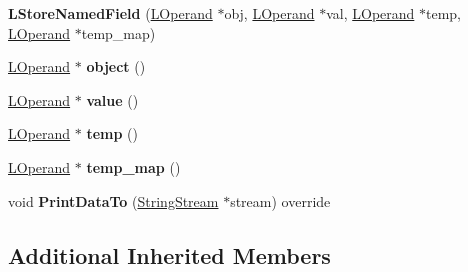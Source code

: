 \begin{DoxyCompactItemize}
\item 
{\bfseries L\+Store\+Named\+Field} (\hyperlink{classv8_1_1internal_1_1_l_operand}{L\+Operand} $\ast$obj, \hyperlink{classv8_1_1internal_1_1_l_operand}{L\+Operand} $\ast$val, \hyperlink{classv8_1_1internal_1_1_l_operand}{L\+Operand} $\ast$temp, \hyperlink{classv8_1_1internal_1_1_l_operand}{L\+Operand} $\ast$temp\+\_\+map)\hypertarget{classv8_1_1internal_1_1_l_store_named_field_a11463f51eadad871a2d243b6aff1733c}{}\label{classv8_1_1internal_1_1_l_store_named_field_a11463f51eadad871a2d243b6aff1733c}

\item 
\hyperlink{classv8_1_1internal_1_1_l_operand}{L\+Operand} $\ast$ {\bfseries object} ()\hypertarget{classv8_1_1internal_1_1_l_store_named_field_a322fe15f20a68dfd3429f31bb46ce109}{}\label{classv8_1_1internal_1_1_l_store_named_field_a322fe15f20a68dfd3429f31bb46ce109}

\item 
\hyperlink{classv8_1_1internal_1_1_l_operand}{L\+Operand} $\ast$ {\bfseries value} ()\hypertarget{classv8_1_1internal_1_1_l_store_named_field_a7c1b623b85070a53e7c8ca36113808c7}{}\label{classv8_1_1internal_1_1_l_store_named_field_a7c1b623b85070a53e7c8ca36113808c7}

\item 
\hyperlink{classv8_1_1internal_1_1_l_operand}{L\+Operand} $\ast$ {\bfseries temp} ()\hypertarget{classv8_1_1internal_1_1_l_store_named_field_ad77491ce510eaa0f150539ec8815c14f}{}\label{classv8_1_1internal_1_1_l_store_named_field_ad77491ce510eaa0f150539ec8815c14f}

\item 
\hyperlink{classv8_1_1internal_1_1_l_operand}{L\+Operand} $\ast$ {\bfseries temp\+\_\+map} ()\hypertarget{classv8_1_1internal_1_1_l_store_named_field_a69d1d376feceac483680f42a3a6989b9}{}\label{classv8_1_1internal_1_1_l_store_named_field_a69d1d376feceac483680f42a3a6989b9}

\item 
void {\bfseries Print\+Data\+To} (\hyperlink{classv8_1_1internal_1_1_string_stream}{String\+Stream} $\ast$stream) override\hypertarget{classv8_1_1internal_1_1_l_store_named_field_a737f49c6847cd030f17c69b314c54b6c}{}\label{classv8_1_1internal_1_1_l_store_named_field_a737f49c6847cd030f17c69b314c54b6c}

\end{DoxyCompactItemize}
\subsection*{Additional Inherited Members}


